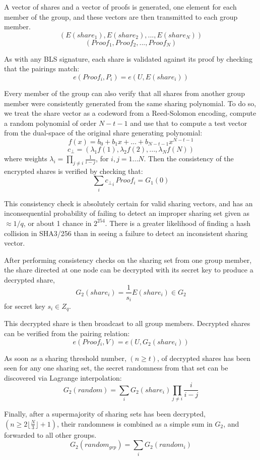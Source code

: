 \documentclass{yellowpaper}
\begin{document}
A vector of shares and a vector of proofs is generated, one element for each member of the group, and these vectors are then transmitted to each group member.
$$(E(share_1), E(share_2), ..., E(share_N))$$
$$ (Proof_1, Proof_2, ..., Proof_N)$$

As with any BLS signature, each share is validated against its proof by checking that the pairings match:
$$ e(Proof_i, P_i) = e(U, E(share_i))$$

Every member of the group can also verify that all shares from another group member were consistently generated from the same sharing polynomial. To do so, we treat the share vector as a codeword from a Reed-Solomon encoding\cite{scrape}, compute a random polynomial of order $N - t - 1$ and use that to compute a test vector from the dual-space of the original share generating polynomial:
$$f(x) = b_0 + b_1 x + ... + b_{N-t-1} x^{N-t-1}$$
$$c_{\perp} = (\lambda_1 f(1), \lambda_2 f(2), ... , \lambda_N f(N))$$
where weights $\lambda_i = \prod_{j \ne i} \frac{1}{i-j}$, for $ i,j = 1...N$.
Then the consistency of the encrypted shares is verified by checking that:
$$\sum_i {c_{\perp}}_i \, Proof_i = G_1(0)$$

This consistency check is absolutely certain for valid sharing vectors, and has an inconsequential probability of failing to detect an improper sharing set given as $\approx 1/q$, or about 1 chance in $2^{254}$. There is a greater likelihood of finding a hash collision in SHA3/256 than in seeing a failure to detect an inconsistent sharing vector.

After performing consistency checks on the sharing set from one group member, the share directed at one node can be decrypted with its secret key to produce a decrypted share, $$G_2(share_i) = \frac{1}{s_i}E(share_i) \in G_2$$ for secret key $s_i \in Z_q$.

This decrypted share is then broadcast to all group members. Decrypted shares can be verified from the pairing relation:
$$ e(Proof_i, V) = e(U, G_2(share_i))$$

As soon as a sharing threshold number, $(n \ge t)$, of decrypted shares has been seen for any one sharing set, the secret randomness from that set can be discovered via Lagrange interpolation:
$$G_2(random) = \sum_i G_2(share_i) \prod_{j \ne i} \frac{i}{i-j}$$

Finally, after a supermajority of sharing sets has been decrypted, $(n \ge 2 \lfloor \frac{N}{3} \rfloor + 1)$, their randomness is combined as a simple sum in $G_2$, and forwarded to all other groups.
$$G_2(random_{grp}) = \sum_i G_2(random_i)$$
\end{document}
